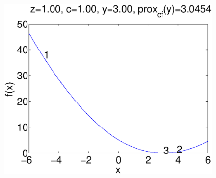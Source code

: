 \documentclass{scrartcl}
\begin{document}
\begin{figure}[H]
\begin{minipage}[b]{0.3\textwidth}
    \includegraphics[scale=0.26]{prob_8_y_3_c_1_z_1.eps}
  \end{minipage}
  

\end{figure}
\end{document}
